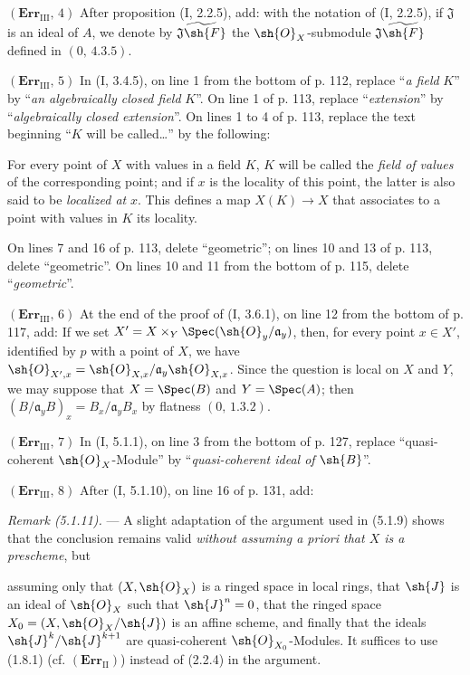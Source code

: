 \noindent\textbf{$(\mathbf{Err}_{\mathrm{III}},\,4)$} After proposition (I,
2.2.5), add: with the notation of (I, 2.2.5), if $\mathfrak J$ is an ideal of
$A$, we denote by $\widetilde{\mathfrak J\sh{F}}$ the
$\sh{O}_X$-submodule $\mathfrak J\widetilde{\sh{F}}$ defined in
$(0,\,4.3.5)$.

\noindent\textbf{$(\mathbf{Err}_{\mathrm{III}},\,5)$} In (I, 3.4.5), on line
1 from the bottom of p. 112, replace ``\emph{a field} $K$'' by ``\emph{an
algebraically closed field} $K$''. On line 1 of p. 113, replace
``\emph{extension}'' by ``\emph{algebraically closed extension}''. On lines 1
to 4 of p. 113, replace the text beginning ``$K$ will be called\ldots{}'' by
the following:

For every point of $X$ with values in a field $K$, $K$ will be called the
\emph{field of values} of the corresponding point; and if $x$ is the locality
of this point, the latter is also said to be \emph{localized at} $x$. This
defines a map $X(K)\to X$ that associates to a point with values in $K$ its
locality.

On lines 7 and 16 of p. 113, delete ``geometric''; on lines 10 and 13 of p.
113, delete ``geometric''. On lines 10 and 11 from the bottom of p. 115,
delete ``\emph{geometric}''.

\noindent\textbf{$(\mathbf{Err}_{\mathrm{III}},\,6)$} At the end of the proof
of (I, 3.6.1), on line 12 from the bottom of p. 117, add: If we set
$X'=X\times_Y\Spec(\sh{O}_y/\mathfrak a_y)$, then, for every point $x\in X'$,
identified by $p$ with a point of $X$, we have
$\sh{O}_{X',x}=\sh{O}_{X,x}/\mathfrak a_y\sh{O}_{X,x}$. Since the question is
local on $X$ and $Y$, we may suppose that $X=\Spec(B)$ and $Y=\Spec(A)$; then
$(B/\mathfrak a_yB)_x=B_x/\mathfrak a_yB_x$ by flatness $(0,\,1.3.2)$.

\noindent\textbf{$(\mathbf{Err}_{\mathrm{III}},\,7)$} In (I, 5.1.1), on line
3 from the bottom of p. 127, replace ``quasi-coherent $\sh{O}_X$-Module'' by
``\emph{quasi-coherent ideal of} $\sh{B}$''.

\noindent\textbf{$(\mathbf{Err}_{\mathrm{III}},\,8)$} After (I, 5.1.10), on
line 16 of p. 131, add:

\emph{Remark (5.1.11).} --- A slight adaptation of the argument used in
(5.1.9) shows that the conclusion remains valid \emph{without assuming a
priori that $X$ is a prescheme}, but

assuming only that $(X,\sh{O}_X)$ is a ringed space in local rings, that
$\sh{J}$ is an ideal of $\sh{O}_X$ such that $\sh{J}^n=0$, that the ringed
space $X_0=(X,\sh{O}_X/\sh{J})$ is an affine scheme, and finally that the
ideals $\sh{J}^k/\sh{J}^{k+1}$ are quasi-coherent $\sh{O}_{X_0}$-Modules. It
suffices to use (1.8.1) (cf. $(\mathbf{Err}_{\mathrm{II}})$) instead of
(2.2.4) in the argument.

